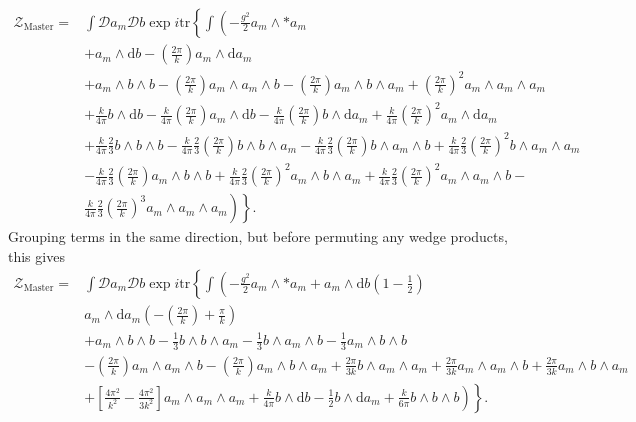 \documentclass{article}
\begin{document}
\begin{align}
    \mathcal{Z}_{\text{Master}}=& \int \mathcal{D}a_{m}\mathcal{D}b\exp i \text{tr}\left\{\int \left(-\frac{g^{2}}{2}a_{m}\wedge * a_{m} \right.\right. \nonumber\\&+ a_{m}\wedge\mathrm{d}b - \left(\frac{2\pi}{k}\right)a_{m}\wedge \mathrm{d}a_{m} \nonumber \\
    &+ a_{m}\wedge b\wedge b -\left(\frac{2\pi}{k}\right)a_{m}\wedge a_{m} \wedge b - \left(\frac{2\pi}{k}\right)a_{m}\wedge b\wedge a_{m}+\left(\frac{2\pi}{k}\right)^{2}a_{m}\wedge a_{m}\wedge a_{m} \nonumber \\
    &+ \frac{k}{4\pi}b\wedge \mathrm{d}b-\frac{k}{4\pi}\left(\frac{2\pi}{k}\right)a_{m}\wedge \mathrm{d}b-\frac{k}{4\pi}\left(\frac{2\pi}{k}\right)b\wedge \mathrm{d}a_{m} + \frac{k}{4\pi}\left(\frac{2\pi}{k}\right)^{2}a_{m}\wedge \mathrm{d}a_{m}
    \nonumber\\&+\frac{k}{4\pi}\frac{2}{3}b\wedge b\wedge b -\frac{k}{4\pi}\frac{2}{3}\left(\frac{2\pi}{k}\right)b\wedge b \wedge a_{m} - \frac{k}{4\pi}\frac{2}{3}\left(\frac{2\pi}{k}\right)b\wedge a_{m}\wedge b + \frac{k}{4\pi}\frac{2}{3}\left(\frac{2\pi}{k}\right)^{2}b\wedge a_{m}\wedge a_{m} \nonumber \\
    &-\frac{k}{4\pi}\frac{2}{3}\left(\frac{2\pi}{k}\right)a_{m}\wedge b \wedge b + \frac{k}{4\pi}\frac{2}{3}\left(\frac{2\pi}{k}\right)^{2}a_{m}\wedge b\wedge a_{m} + \frac{k}{4\pi}\frac{2}{3}\left(\frac{2\pi}{k}\right)^{2}a_{m}\wedge a_{m}\wedge b -\nonumber\\
    &\left.\left.\frac{k}{4\pi}\frac{2}{3}\left(\frac{2\pi}{k}\right)^{3}a_{m}\wedge a_{m}\wedge a_{m}\right)\right\}.
\end{align}
Grouping terms in the same direction, but before permuting any wedge products, this gives
\begin{align}
    \mathcal{Z}_{\text{Master}}=& \int \mathcal{D}a_{m}\mathcal{D}b\exp i \text{tr}\left\{\int \left(-\frac{g^{2}}{2}a_{m}\wedge * a_{m} + a_{m}\wedge\mathrm{d}b\left(1-\frac{1}{2}\right)
    \right.\right. \nonumber\\
    &a_{m}\wedge \mathrm{d}a_{m}\left(- \left(\frac{2\pi}{k}\right)+ \frac{\pi}{k} \right)\nonumber \\
    &+ a_{m}\wedge b\wedge b-\frac{1}{3}b\wedge b \wedge a_{m}- \frac{1}{3}b\wedge a_{m}\wedge b-\frac{1}{3}a_{m}\wedge b \wedge b\nonumber\\
    &-\left(\frac{2\pi}{k}\right)a_{m}\wedge a_{m} \wedge b- \left(\frac{2\pi}{k}\right)a_{m}\wedge b\wedge a_{m}+ \frac{2\pi}{3k}b\wedge a_{m}\wedge a_{m}+ \frac{2\pi}{3k}a_{m}\wedge a_{m}\wedge b+ \frac{2\pi}{3k}a_{m}\wedge b\wedge a_{m} \nonumber \\
    &\left.\left.  +\left[\frac{4\pi^{2}}{k^{2}} -\frac{4\pi^{2}}{3k^{2}}\right]a_{m}\wedge a_{m}\wedge a_{m}+ \frac{k}{4\pi}b\wedge \mathrm{d}b-\frac{1}{2}b\wedge \mathrm{d}a_{m} 
    +\frac{k}{6\pi}b\wedge b\wedge b   \right)\right\}.
\end{align}
\end{document}
